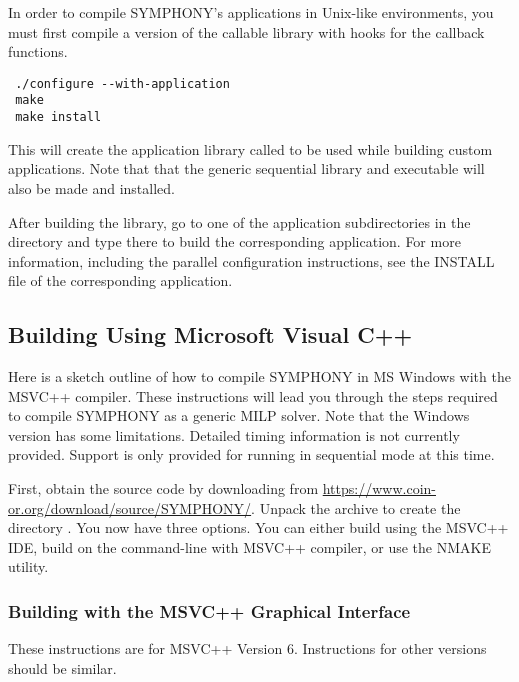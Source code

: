 In order to compile SYMPHONY's applications in Unix-like environments, you
must first compile a version of the callable library with hooks for the
callback functions. {\color{Brown}
\begin{verbatim}
 ./configure --with-application
 make 
 make install
\end{verbatim}
} This will create the application library called  to be used
while building custom applications. Note that that the generic sequential
library and executable will also be made and installed.

After building the library, go to one of the application subdirectories in the
 directory and type  there to build
the corresponding application. For more information, including the parallel
configuration instructions, see the INSTALL file of the corresponding
application.

\subsection{Building Using Microsoft Visual C++}
\label{getting_started_windows}

Here is a sketch outline of how to compile SYMPHONY in MS Windows with the
MSVC++ compiler. These instructions will lead you through the steps required
to compile SYMPHONY as a generic MILP solver. Note that the Windows version
has some limitations. Detailed timing information is not currently provided.
Support is only provided for running in sequential mode at this time.

First, obtain the source code by downloading from
\url{https://www.coin-or.org/download/source/SYMPHONY/}. Unpack the archive to
create the directory . You now have three options. You
can either build using the MSVC++ IDE, build on the command-line with MSVC++
compiler, or use the NMAKE utility.

\subsubsection{Building with the MSVC++ Graphical Interface}
\label{using_msvc}

These instructions are for MSVC++ Version 6. Instructions for other versions
should be similar.

